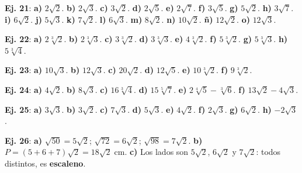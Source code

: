 \documentclass[11pt, letterpaper]{article}
\begin{document}
\begin{tcolorbox}[answerbox, title={Bloque F — Simplificación}]

\noindent\textbf{Ej. 21}: \textbf{a)} $2\sqrt{2}$. \textbf{b)} $2\sqrt{3}$. \textbf{c)} $3\sqrt{2}$. \textbf{d)} $2\sqrt{5}$. \textbf{e)} $2\sqrt{7}$. \textbf{f)} $3\sqrt{5}$. \textbf{g)} $5\sqrt{2}$. \textbf{h)} $3\sqrt{7}$. \textbf{i)} $6\sqrt{2}$. \textbf{j)} $5\sqrt{3}$. \textbf{k)} $7\sqrt{2}$. \textbf{l)} $6\sqrt{3}$. \textbf{m)} $8\sqrt{2}$. \textbf{n)} $10\sqrt{2}$. \textbf{ñ)} $12\sqrt{2}$. \textbf{o)} $12\sqrt{3}$.

\medskip

\noindent\textbf{Ej. 22}: \textbf{a)} $2\sqrt[3]{2}$. \textbf{b)} $2\sqrt[3]{3}$. \textbf{c)} $3\sqrt[3]{2}$. \textbf{d)} $3\sqrt[3]{3}$. \textbf{e)} $4\sqrt[3]{2}$. \textbf{f)} $5\sqrt[3]{2}$. \textbf{g)} $5\sqrt[3]{3}$. \textbf{h)} $5\sqrt[3]{4}$.

\medskip

\noindent\textbf{Ej. 23}: \textbf{a)} $10\sqrt{3}$. \textbf{b)} $12\sqrt{3}$. \textbf{c)} $20\sqrt{2}$. \textbf{d)} $12\sqrt{5}$. \textbf{e)} $10\sqrt[3]{2}$. \textbf{f)} $9\sqrt[3]{2}$.
\end{tcolorbox}

\medskip

\begin{tcolorbox}[answerbox, title={Bloque G — Suma y resta de radicales}]

\noindent\textbf{Ej. 24}: \textbf{a)} $4\sqrt{2}$. \textbf{b)} $8\sqrt{3}$. \textbf{c)} $16\sqrt[3]{4}$. \textbf{d)} $15\sqrt[5]{7}$. \textbf{e)} $2\sqrt[4]{5}-\sqrt[3]{6}$. \textbf{f)} $13\sqrt{2}-4\sqrt{3}$.

\medskip

\noindent\textbf{Ej. 25}: \textbf{a)} $3\sqrt{3}$. \textbf{b)} $3\sqrt{2}$. \textbf{c)} $7\sqrt{3}$. \textbf{d)} $5\sqrt{3}$. \textbf{e)} $4\sqrt{2}$. \textbf{f)} $2\sqrt{3}$. \textbf{g)} $6\sqrt{2}$. \textbf{h)} $-2\sqrt{3}$.

\medskip

\noindent\textbf{Ej. 26}: \textbf{a)} $\sqrt{50}=5\sqrt{2}$; $\sqrt{72}=6\sqrt{2}$; $\sqrt{98}=7\sqrt{2}$. \textbf{b)} $P=(5+6+7)\sqrt{2}=18\sqrt{2}\;\text{cm}$. \textbf{c)} Los lados son $5\sqrt{2}$, $6\sqrt{2}$ y $7\sqrt{2}$: todos distintos, es \textbf{escaleno}.
\end{tcolorbox}

\medskip
\end{document}
